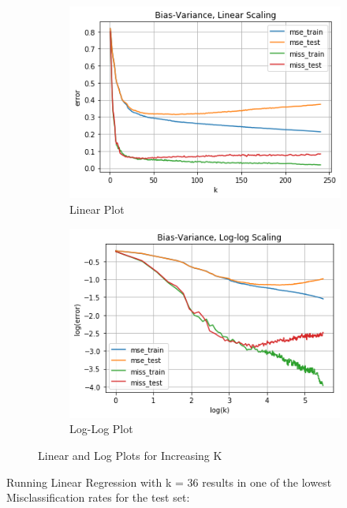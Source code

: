 \documentclass[a4paper]{article}
\begin{document}
\begin{figure}[h!]
  \centering
  \begin{subfigure}[b]{0.87\linewidth}
    \includegraphics[width=\linewidth]{./1.png}
    \caption{Linear Plot}
  \end{subfigure}
  \begin{subfigure}[b]{0.87\linewidth}
    \includegraphics[width=\linewidth]{./2.png}
    \caption{Log-Log Plot}
  \end{subfigure}
  \caption{Linear and Log Plots for Increasing K }
  \label{fig:plots}
\end{figure}

\newpage

Running Linear Regression with k = 36 results in one of the lowest Misclassification rates for the test set: \\
\end{document}
